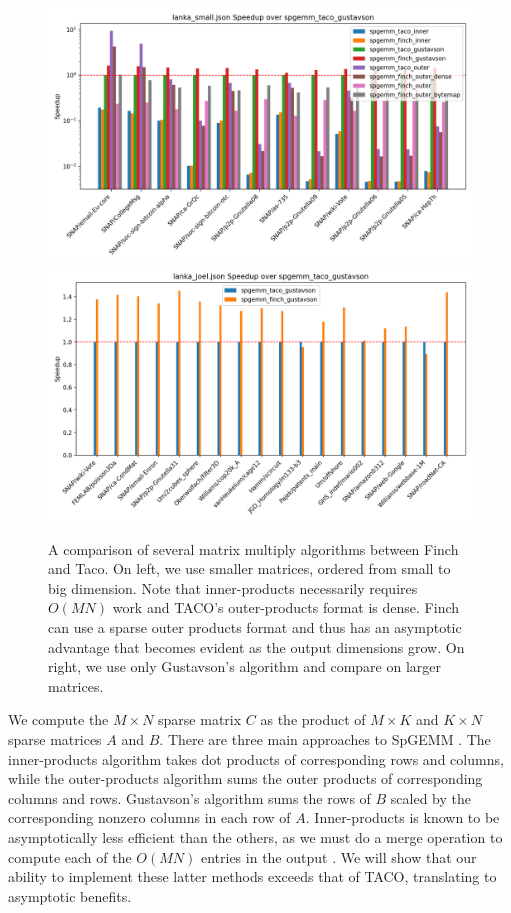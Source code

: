 \begin{figure}[b]
	\includegraphics[width=0.5\linewidth]{spgemm_small_speedup_log_scale.png}%
	\includegraphics[width=0.5\linewidth]{spgemm_joel_speedup.png}
    \vspace{-8pt}
    \caption{A comparison of several matrix multiply algorithms between
    Finch and Taco. On left, we use smaller matrices, ordered from small to big
    dimension. Note that inner-products necessarily requires $O(MN)$ work and
    TACO's outer-products format is dense. Finch can use a sparse outer products
    format and thus has an asymptotic advantage that becomes evident as the
    output dimensions grow. On right, we use only Gustavson's algorithm and
    compare on larger matrices.}
    \label{fig:spgemm}
    \vspace{-12pt}
\end{figure}


We compute the $M \times N$ sparse matrix $C$ as the product of $M \times K$ and $K \times N$ sparse matrices $A$ and $B$.
%
There are three main approaches to SpGEMM \cite[Section 2.2]{zhang2021gamma}.
%
The inner-products algorithm takes dot products of corresponding rows and columns, while the outer-products algorithm sums the outer products of corresponding columns and rows.
%
Gustavson's algorithm sums the rows of $B$ scaled by the corresponding nonzero columns in each row of $A$.
%
Inner-products is known to be asymptotically less efficient than the others, as we must do a merge operation to compute each of the $O(MN)$ entries in the output \cite{ahrens2022autoscheduling}.
%
We will show that our ability to implement these latter methods exceeds that of TACO, translating to asymptotic benefits. 
% 

